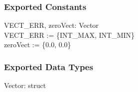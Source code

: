 \documentclass[12pt]{article}
\begin{document}
\subsubsection{Exported Constants} \label{SecECVector}
	VECT_ERR, zeroVect: Vector \\
	VECT_ERR := \{INT_MAX, INT_MIN\} \\
	zeroVect := \{0.0, 0.0\}
	

\subsubsection{Exported Data Types} \label{SecEDTVector}
	Vector: struct 
\end{document}
